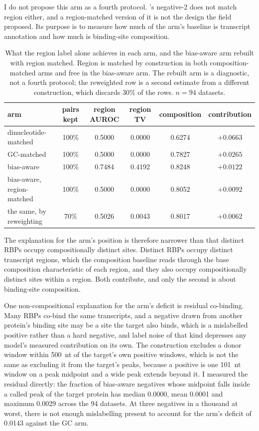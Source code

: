 I do not propose this arm as a fourth protocol. \citet{horlacher2023}'s negative-2 does not
match region either, and a region-matched version of it is not the design the field proposed.
Its purpose is to measure how much of the arm's baseline is transcript annotation and how much is
binding-site composition.

\begin{table}[htbp]
\centering
\caption{What the region label alone achieves in each arm, and the bias-aware arm rebuilt with
region matched. Region is matched by construction in both composition-matched arms and free in
the bias-aware arm. The rebuilt arm is a diagnostic, not a fourth protocol; the reweighted row
is a second estimate from a different construction, which discards 30\% of the rows.
$n=94$ datasets.}
\label{tab:region}
\small
\begin{tabular}{lccccc}
\toprule
arm & pairs kept & region AUROC & region TV & composition & contribution \\
\midrule
dinucleotide-matched & 100\% & 0.5000 & 0.0000 & 0.6274 & $+0.0663$ \\
GC-matched & 100\% & 0.5000 & 0.0000 & 0.7827 & $+0.0265$ \\
bias-aware & 100\% & 0.7484 & 0.4192 & 0.8248 & $+0.0122$ \\
bias-aware, region-matched & 100\% & 0.5000 & 0.0000 & 0.8052 & $+0.0092$ \\
\quad the same, by reweighting & 70\% & 0.5026 & 0.0043 & 0.8017 & $+0.0062$ \\
\bottomrule
\end{tabular}
\end{table}

The explanation for the arm's position is therefore narrower than that distinct RBPs occupy
compositionally distinct sites. Distinct RBPs occupy distinct transcript regions, which the
composition baseline reads through the base composition characteristic of each region, and they
also occupy compositionally distinct sites within a region. Both contribute, and only the second
is about binding-site composition.

One non-compositional explanation for the arm's deficit is residual co-binding. Many RBPs
co-bind the same transcripts, and a negative drawn
from another protein's binding site may be a site the target also binds, which is a mislabelled
positive rather than a hard negative, and label noise of that kind depresses any model's
measured contribution on its own. The construction excludes a donor window within 500~nt of the
target's own positive windows, which is not the same as excluding it from the target's peaks,
because a positive is one 101~nt window on a peak midpoint and a wide peak extends beyond it. I
measured the residual directly: the fraction of bias-aware negatives whose midpoint falls inside
a called peak of the target protein has median 0.0000, mean 0.0001 and maximum 0.0029 across the
94 datasets. At three negatives in a thousand at worst, there is not enough mislabelling present
to account for the arm's deficit of 0.0143 against the GC arm.

